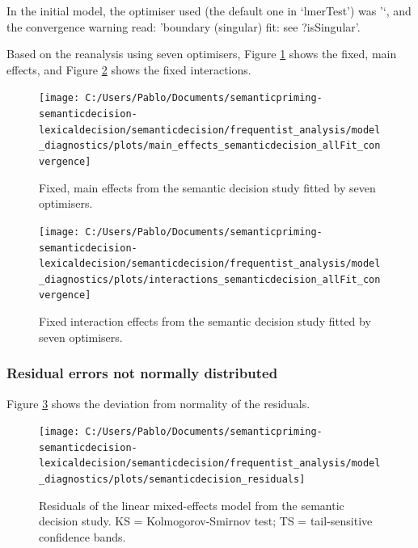 \documentclass[
  12pt,
  man,floatsintext]{apa7}
\begin{document}
In the initial model, the optimiser used (the default one in `lmerTest') was '`, and the convergence warning read: 'boundary (singular) fit: see ?isSingular'.

Based on the reanalysis using seven optimisers, Figure \ref{fig:main-effects-semanticdecision-allFit-convergence} shows the fixed, main effects, and Figure \ref{fig:interactions-semanticdecision-allFit-convergence} shows the fixed interactions.

\begin{figure}

{\centering \texttt{[image: C:/Users/Pablo/Documents/semanticpriming-semanticdecision-lexicaldecision/semanticdecision/frequentist\_analysis/model\_diagnostics/plots/main\_effects\_semanticdecision\_allFit\_convergence]} 

}

\caption{Fixed, main effects from the semantic decision study fitted by seven optimisers.}\label{fig:main-effects-semanticdecision-allFit-convergence}
\end{figure}

\begin{figure}

{\centering \texttt{[image: C:/Users/Pablo/Documents/semanticpriming-semanticdecision-lexicaldecision/semanticdecision/frequentist\_analysis/model\_diagnostics/plots/interactions\_semanticdecision\_allFit\_convergence]} 

}

\caption{Fixed interaction effects from the semantic decision study fitted by seven optimisers.}\label{fig:interactions-semanticdecision-allFit-convergence}
\end{figure}

\hypertarget{residual-errors-not-normally-distributed-3}{%
\subsubsection{Residual errors not normally distributed}\label{residual-errors-not-normally-distributed-3}}

Figure \ref{fig:semanticdecision-residuals} shows the deviation from normality of the residuals.

\begin{figure}

{\centering \texttt{[image: C:/Users/Pablo/Documents/semanticpriming-semanticdecision-lexicaldecision/semanticdecision/frequentist\_analysis/model\_diagnostics/plots/semanticdecision\_residuals]} 

}

\caption{Residuals of the linear mixed-effects model from the semantic decision study. \linebreak KS = Kolmogorov-Smirnov test; TS = tail-sensitive confidence bands.}\label{fig:semanticdecision-residuals}
\end{figure}
\end{document}
